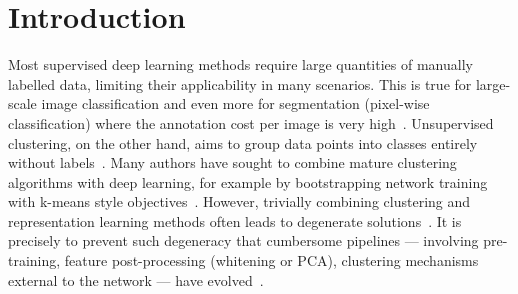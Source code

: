 \documentclass[10pt,twocolumn,letterpaper]{article}
\begin{document}
\begin{abstract}
\begin{comment}
We present a novel clustering objective that trains a randomly-initialised network into a classifier without any example labels provided in training or testing.
The discovered clusters correspond to semantic classes with high accuracy, setting new state-of-the-art records on 8 unsupervised datasets across image classification and segmentation, including STL10, an unsupervised variant of ImageNet on which we beat our closest competitor by 8\%. 
The method is not specialised to computer vision and can use any data with a pairwise distance metric; in our experiments we use random transforms to obtain a pair from each image.
The objective is simply to maximise mutual information between the class assignments of each pair.
It is easy to implement and rigorously grounded in information theory, meaning unlike other methods, we are able to avoid degenerate solutions with no effort. 
The objective optimises for the final clusters and therefore the trained network directly outputs semantic labels rather than high dimensional representations that need external processing to be usable.
In addition to the fully unsupervised mode, we also test two semi-supervised settings, setting a new global state of the art of 88.8\% accuracy on STL10 classification out of all known methods (whether supervised, semi-supervised or unsupervised) and demonstrating robustness to 90\% reductions in label coverage, of relevance to applications that wish to make use of small amounts of labels.
\end{comment}
\end{abstract}

\section{Introduction}\label{s:intro}

Most supervised deep learning methods require large quantities of manually labelled data, limiting their applicability in many scenarios.
This is true for large-scale image classification and even more for segmentation (pixel-wise classification) where the annotation cost per image is very high~\cite{lin2014microsoft,girshick2014rich}.
Unsupervised clustering, on the other hand, aims to group data points into classes entirely without labels~\cite{hartigan1972direct}.
Many authors have sought to combine mature clustering algorithms with deep learning, for example by bootstrapping network training with k-means style objectives~\cite{xie2016unsupervised, haeusser2018associative, caron2018deep}.
However, trivially combining clustering and representation learning methods often leads to degenerate solutions~\cite{caron2018deep, xie2016unsupervised}.
It is precisely to prevent such degeneracy that cumbersome pipelines --- involving pre-training, feature post-processing (whitening or PCA), clustering mechanisms external to the network --- have evolved~\cite{caron2018deep,doersch2015unsupervised,dosovitskiy2015discriminative,xie2016unsupervised}.
\end{document}
